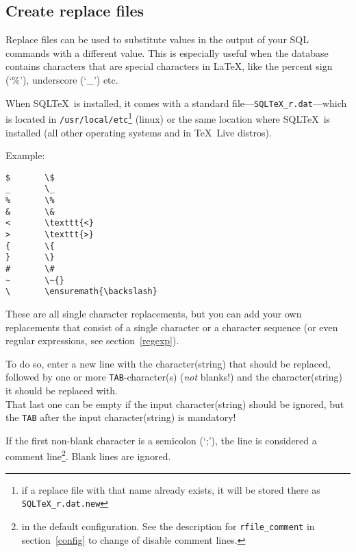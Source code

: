 \documentclass{article}
\newcommand{\vs}{\vspace{3mm}}
\begin{document}
\subsection{Create replace files}\label{replfiles}

Replace files can be used to substitute values in the output of your SQL commands with a different value. This is especially useful when the database
contains characters that are special characters in \LaTeX, like the percent sign (`\%'), underscore (`\_') etc.

When SQL\TeX\ is installed, it comes with a standard file---\texttt{SQLTeX\_r.dat}---which is located in \texttt{/usr/local/etc}\footnote{ if a replace file with that name already exists, it will be stored there as \texttt{SQLTeX\_r.dat.new}} (linux) or the same location where SQL\TeX\ is installed (all other operating systems and in \TeX\ Live distros).

\vspace{3mm}

\noindent Example:
\begin{verbatim}
$       \$
_       \_
%       \%
&       \&
<       \texttt{<}
>       \texttt{>}
{       \{
}       \}
#       \#
~       \~{}
\       \ensuremath{\backslash}
\end{verbatim}

\vspace{3mm}

These are all single character replacements, but you can add your own replacements that consist of a single character or a character sequence (or even regular expressions, see section~\ref{regexp}).

\vs

To do so, enter a new line with the character(string) that should be replaced, followed by one or more \texttt{TAB}-character(s) (\textit{not} blanks!) and the character(string) it should be replaced with.\\
That last one can be empty if the input character(string) should be ignored, but the \texttt{TAB} after the input character(string) is mandatory!

\vs

If the first non-blank character is a semicolon (`;'), the line is considered a comment line\footnote{ in the default configuration. See the description for \texttt{rfile\_comment} in section~\ref{config} to change of disable comment lines.}. Blank lines are ignored.

\vspace{3mm}
\end{document}

